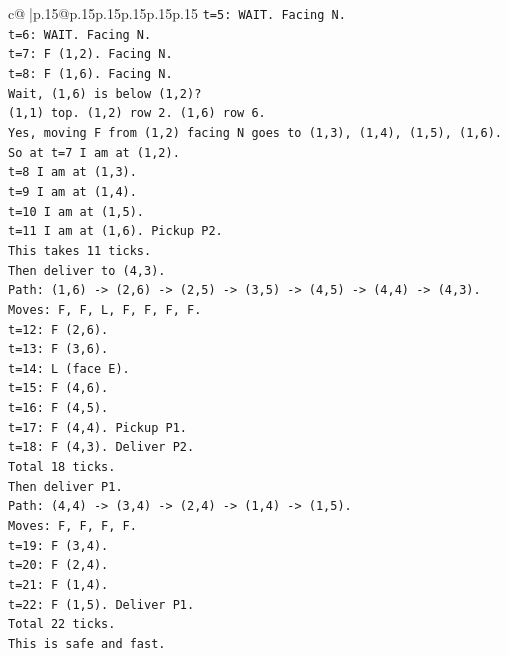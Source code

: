\documentclass{article}
\begin{document}
{\begin{supertabular}{c@{$\;$}|p{.15\linewidth}@{}p{.15\linewidth}p{.15\linewidth}p{.15\linewidth}p{.15\linewidth}p{.15\linewidth}}
{{{\texttt{t=5: WAIT. Facing N.} \\
\texttt{t=6: WAIT. Facing N.} \\
\texttt{t=7: F (1,2). Facing N.} \\
\texttt{t=8: F (1,6). Facing N.} \\
\texttt{Wait, (1,6) is below (1,2)?} \\
\texttt{(1,1) top. (1,2) row 2. (1,6) row 6.} \\
\texttt{Yes, moving F from (1,2) facing N goes to (1,3), (1,4), (1,5), (1,6).} \\
\texttt{So at t=7 I am at (1,2).} \\
\texttt{t=8 I am at (1,3).} \\
\texttt{t=9 I am at (1,4).} \\
\texttt{t=10 I am at (1,5).} \\
\texttt{t=11 I am at (1,6). Pickup P2.} \\
\texttt{This takes 11 ticks.} \\
\texttt{Then deliver to (4,3).} \\
\texttt{Path: (1,6) {-}> (2,6) {-}> (2,5) {-}> (3,5) {-}> (4,5) {-}> (4,4) {-}> (4,3).} \\
\texttt{Moves: F, F, L, F, F, F, F.} \\
\texttt{t=12: F (2,6).} \\
\texttt{t=13: F (3,6).} \\
\texttt{t=14: L (face E).} \\
\texttt{t=15: F (4,6).} \\
\texttt{t=16: F (4,5).} \\
\texttt{t=17: F (4,4). Pickup P1.} \\
\texttt{t=18: F (4,3). Deliver P2.} \\
\texttt{Total 18 ticks.} \\
\texttt{Then deliver P1.} \\
\texttt{Path: (4,4) {-}> (3,4) {-}> (2,4) {-}> (1,4) {-}> (1,5).} \\
\texttt{Moves: F, F, F, F.} \\
\texttt{t=19: F (3,4).} \\
\texttt{t=20: F (2,4).} \\
\texttt{t=21: F (1,4).} \\
\texttt{t=22: F (1,5). Deliver P1.} \\
\texttt{Total 22 ticks.} \\
\texttt{This is safe and fast.} \\
\\ 
}}}
\end{supertabular}}
\end{document}
